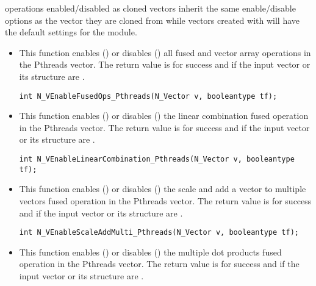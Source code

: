 operations enabled/disabled as cloned vectors inherit the same enable/disable
options as the vector they are cloned from while vectors created with
 will have the default settings for the {\nvecpthreads} module.
\begin{itemize}


\item {}

This function enables () or disables () all fused and
vector array operations in the Pthreads vector. The return value is  for
success and  if the input vector or its  structure are .

\verb|int N_VEnableFusedOps_Pthreads(N_Vector v, booleantype tf);|


\item {}

This function enables () or disables () the linear
combination fused operation in the Pthreads vector. The return value is  for
success and  if the input vector or its  structure are .

\verb|int N_VEnableLinearCombination_Pthreads(N_Vector v, booleantype tf);|


\item {}

This function enables () or disables () the scale and
add a vector to multiple vectors fused operation in the Pthreads vector. The
return value is  for success and  if the input vector or its
 structure are .

\verb|int N_VEnableScaleAddMulti_Pthreads(N_Vector v, booleantype tf);|


\item {}

This function enables () or disables () the multiple
dot products fused operation in the Pthreads vector. The return value is 
for success and  if the input vector or its  structure are
.


\end{itemize}
